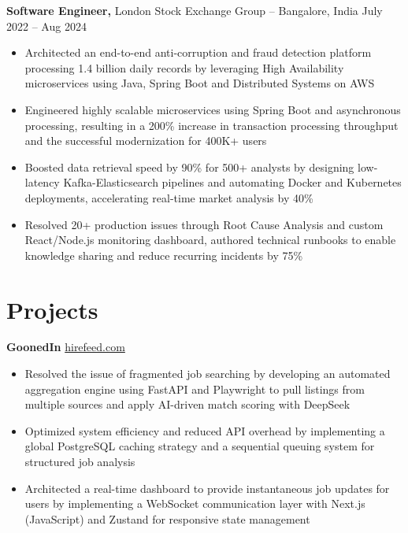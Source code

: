 \documentclass[11pt]{article}       %
\begin{document}
\textbf{Software Engineer,} {London Stock Exchange Group} -- Bangalore, India \hfill July 2022 -- Aug 2024 \\
\vspace{-9pt}
\begin{itemize}
    \item Architected an end-to-end anti-corruption and fraud detection platform processing 1.4 billion daily records by leveraging High Availability microservices using Java, Spring Boot and Distributed Systems on AWS
    \item Engineered highly scalable microservices using Spring Boot and asynchronous processing, resulting in a 200\% increase in transaction processing throughput and the successful modernization for 400K+ users
    \item Boosted data retrieval speed by 90\% for 500+ analysts by designing low-latency Kafka-Elasticsearch pipelines and automating Docker and Kubernetes deployments, accelerating real-time market analysis by 40\%
    \item Resolved 20+ production issues through Root Cause Analysis and custom React/Node.js monitoring dashboard, authored technical runbooks to enable knowledge sharing and reduce recurring incidents by 75\%
\end{itemize}

\vspace{-6pt}

\section*{Projects}
\textbf{GoonedIn} \hfill \href{https://goonedin.xyz/}{hirefeed.com} \\
\vspace{-9pt}
\begin{itemize}
  \item Resolved the issue of fragmented job searching by developing an automated aggregation engine using FastAPI and Playwright to pull listings from multiple sources and apply AI-driven match scoring with DeepSeek
  \item Optimized system efficiency and reduced API overhead by implementing a global PostgreSQL caching strategy and a sequential queuing system for structured job analysis
  \item Architected a real-time dashboard to provide instantaneous job updates for users by implementing a WebSocket communication layer with Next.js (JavaScript) and Zustand for responsive state management
\end{itemize}
\end{document}
